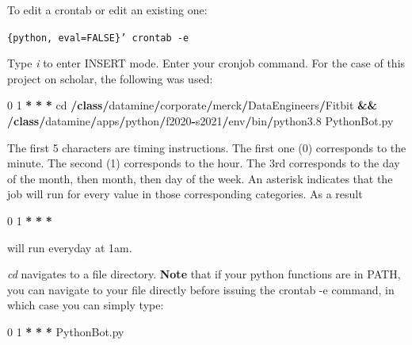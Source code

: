 \documentclass[]{book}
\newenvironment{Shaded}{\begin{snugshade}}{\end{snugshade}}
\newcommand{\KeywordTok}[1]{\textcolor[rgb]{0.13,0.29,0.53}{\textbf{#1}}}
\newcommand{\DecValTok}[1]{\textcolor[rgb]{0.00,0.00,0.81}{#1}}
\newcommand{\FloatTok}[1]{\textcolor[rgb]{0.00,0.00,0.81}{#1}}
\newcommand{\OperatorTok}[1]{\textcolor[rgb]{0.81,0.36,0.00}{\textbf{#1}}}
\newcommand{\BuiltInTok}[1]{#1}
\newcommand{\NormalTok}[1]{#1}
\begin{document}
To edit a crontab or edit an existing one:

\texttt{\{python,\ eval=FALSE\}’\ crontab\ -e}

Type \emph{i} to enter INSERT mode. Enter your cronjob command. For the
case of this project on scholar, the following was used:

\begin{Shaded}
\begin{Highlighting}[]
\DecValTok{0} \DecValTok{1} \OperatorTok{*} \OperatorTok{*} \OperatorTok{*}\NormalTok{ cd }\OperatorTok{/}\KeywordTok{class}\OperatorTok{/}\NormalTok{datamine}\OperatorTok{/}\NormalTok{corporate}\OperatorTok{/}\NormalTok{merck}\OperatorTok{/}\NormalTok{DataEngineers}\OperatorTok{/}\NormalTok{Fitbit }\OperatorTok{&&} \OperatorTok{/}\KeywordTok{class}\OperatorTok{/}\NormalTok{datamine}\OperatorTok{/}\NormalTok{apps}\OperatorTok{/}\NormalTok{python}\OperatorTok{/}\NormalTok{f2020}\OperatorTok{-}\NormalTok{s2021}\OperatorTok{/}\NormalTok{env}\OperatorTok{/}\BuiltInTok{bin}\OperatorTok{/}\NormalTok{python3}\FloatTok{.8}\NormalTok{ PythonBot.py}
\end{Highlighting}
\end{Shaded}

The first 5 characters are timing instructions. The first one (0)
corresponds to the minute. The second (1) corresponds to the hour. The
3rd corresponds to the day of the month, then month, then day of the
week. An asterisk indicates that the job will run for every value in
those corresponding categories. As a result

\begin{Shaded}
\begin{Highlighting}[]
\DecValTok{0} \DecValTok{1} \OperatorTok{*} \OperatorTok{*} \OperatorTok{*} 
\end{Highlighting}
\end{Shaded}

will run everyday at 1am.

\emph{cd} navigates to a file directory. \textbf{Note} that if your
python functions are in PATH, you can navigate to your file directly
before issuing the crontab -e command, in which case you can simply
type:

\begin{Shaded}
\begin{Highlighting}[]
\DecValTok{0} \DecValTok{1} \OperatorTok{*} \OperatorTok{*} \OperatorTok{*}\NormalTok{ PythonBot.py}
\end{Highlighting}
\end{Shaded}
\end{document}
